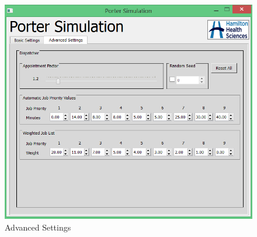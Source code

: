 \documentclass[paper=letter, fontsize=10pt]{scrartcl}
\numberwithin{equation}{section}		%
\numberwithin{figure}{section}			%
\numberwithin{table}{section}				%
\begin{document}
	\begin{figure}[!htbp]
	\begin{center}
		\includegraphics[width=1\columnwidth, height=0.45\textheight, keepaspectratio]{AdvancedSettings.png}
		\caption{Advanced Settings}
	\end{center}
	\end{figure} 
\end{document}
